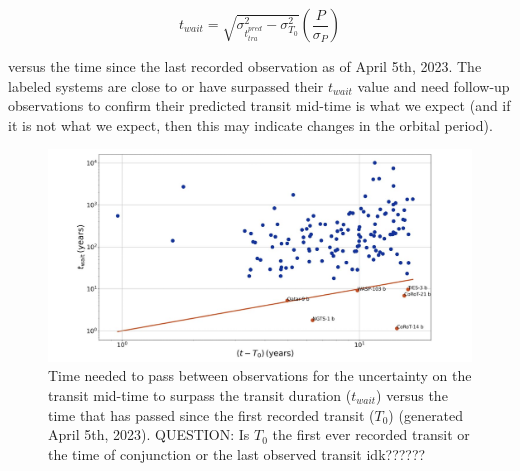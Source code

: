 \documentclass[oneside,12pt]{amsart}
\numberwithin{page}{section}
\begin{document}
\begin{equation}
    t_{wait} = \sqrt{\sigma^{2}_{t^{pred}_{tra}} - \sigma^{2}_{T_{0}}} \left(\frac{P}{\sigma_{P}} \right)
    \label{t_wait}
\end{equation}

versus the time since the last recorded observation as of April 5th, 2023. The labeled systems are close to or have surpassed their $t_{wait}$ value and need follow-up observations to confirm their predicted transit mid-time is what we expect (and if it is not what we expect, then this may indicate changes in the orbital period). 

\begin{figure}[htbp]
    \centering 
    \includegraphics[width=\linewidth]{figs/jackson_fig3.png}
    \caption{Time needed to pass between observations for the uncertainty on the transit mid-time to surpass the transit duration ($t_{wait}$) versus the time that has passed since the first recorded transit ($T_0$) (generated April 5th, 2023). QUESTION: Is $T_0$ the first ever recorded transit or the time of conjunction or the last observed transit idk??????}
    \label{fig:jackson_fig3}
\end{figure}


\end{document}
